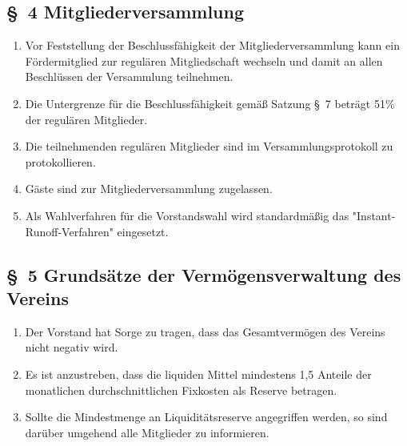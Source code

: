 \documentclass[10pt,a4paper]{scrartcl}
\newcommand{\qs}[1]{"#1"}
\begin{document}
\subsection*{\S \ 4 Mitgliederversammlung}
\begin{enumerate}
\item Vor Feststellung der Beschlussf{\"a}higkeit der Mitgliederversammlung kann ein F{\"o}rdermitglied zur regul{\"a}ren Mitgliedschaft wechseln und damit an allen Beschl{\"u}ssen der Versammlung teilnehmen.
\item Die Untergrenze f{\"u}r die Beschlussf{\"a}higkeit gem{\"a}{\ss} Satzung \S \ 7 betr{\"a}gt 51\% der regul{\"a}ren Mitglieder.
\item Die teilnehmenden regul{\"a}ren Mitglieder sind im Versammlungsprotokoll zu protokollieren.
\item G{\"a}ste sind zur Mitgliederversammlung zugelassen.
\item Als Wahlverfahren f{\"u}r die Vorstandswahl wird standardm{\"a}{\ss}ig das \qs{Instant-Runoff-Verfahren} eingesetzt.
\end{enumerate}
%
%
\subsection*{\S \ 5 Grunds{\"a}tze der Verm{\"o}gensverwaltung des Vereins}
\begin{enumerate}
\item Der Vorstand hat Sorge zu tragen, dass das Gesamtverm{\"o}gen des Vereins nicht negativ wird.
\item Es ist anzustreben, dass die liquiden Mittel mindestens 1,5 Anteile der monatlichen durchschnittlichen Fixkosten als Reserve betragen.
\item Sollte die Mindestmenge an Liquidit{\"a}tsreserve angegriffen werden, so sind dar{\"u}ber umgehend alle Mitglieder zu informieren.
\end{enumerate}

%
%
\end{document}
